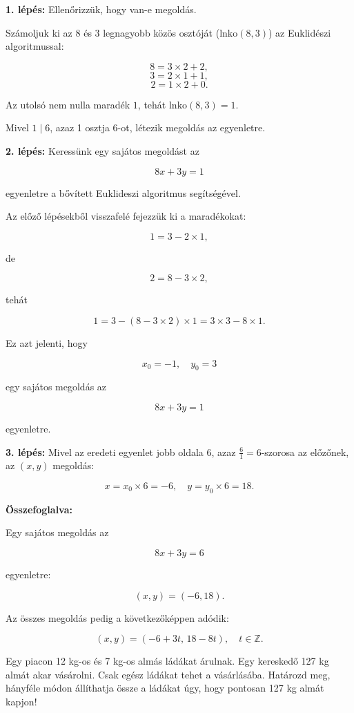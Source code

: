 \begin{solution}
\textbf{1. lépés:} Ellenőrizzük, hogy van-e megoldás.

Számoljuk ki az $8$ és $3$ legnagyobb közös osztóját ($\mathrm{lnko}(8,3)$)
az Euklidészi algoritmussal:

\[
8=3\times2+2,
\]
\[
3=2\times1+1,
\]
\[
2=1\times2+0.
\]

Az utolsó nem nulla maradék $1$, tehát $\mathrm{lnko}(8,3)=1$.

Mivel $1\mid6$, azaz 1 osztja 6-ot, létezik megoldás az egyenletre.

\medskip{}

\textbf{2. lépés:} Keressünk egy sajátos megoldást az

\[
8x+3y=1
\]

egyenletre a bővített Euklideszi algoritmus segítségével.

Az előző lépésekből visszafelé fejezzük ki a maradékokat:

\[
1=3-2\times1,
\]

de

\[
2=8-3\times2,
\]

tehát

\[
1=3-(8-3\times2)\times1=3\times3-8\times1.
\]

Ez azt jelenti, hogy

\[
x_{0}=-1,\quad y_{0}=3
\]

egy sajátos megoldás az

\[
8x+3y=1
\]

egyenletre.

\medskip{}

\textbf{3. lépés:} Mivel az eredeti egyenlet jobb oldala $6$, azaz
$\frac{6}{1}=6$-szorosa az előzőnek, az $(x,y)$ megoldás:

\[
x=x_{0}\times6=-6,\quad y=y_{0}\times6=18.
\]

\medskip{}

\textbf{Összefoglalva:}

Egy sajátos megoldás az

\[
8x+3y=6
\]

egyenletre:

\[
(x,y)=(-6,18).
\]

Az összes megoldás pedig a következőképpen adódik:

\[
(x,y)=(-6+3t,\,18-8t),\quad t\in\mathbb{Z}.
\]
\end{solution}
\begin{problem}
Egy piacon 12 kg-os és 7 kg-os almás ládákat árulnak. Egy kereskedő
127 kg almát akar vásárolni. Csak egész ládákat tehet a vásárlásába.
Határozd meg, hányféle módon állíthatja össze a ládákat úgy, hogy
pontosan 127 kg almát kapjon! 
\end{problem}

